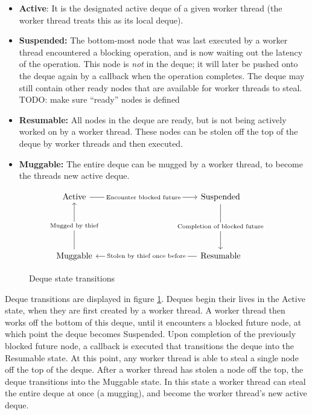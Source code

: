 \documentclass[bsc,frontabs,singlespacing,parskip,deptreport,normalheadings]{infthesis}
\begin{document}
\begin{itemize}
    \item \textbf{Active}: It is the designated active deque of a given worker
        thread (the worker thread treats this as its local deque).
    \item \textbf{Suspended:} The bottom-most node that was last executed by a
        worker thread encountered a blocking operation, and is now waiting out
        the latency of the operation. This node is \textit{not} in the deque; it
        will later be pushed onto the deque again by a callback when the
        operation completes. The deque may still contain other ready nodes that
        are available for worker threads to steal. TODO: make sure ``ready''
        nodes is defined
    \item \textbf{Resumable:} All nodes in the deque are ready, but is not being
        actively worked on by a worker thread. These nodes can be stolen off the
        top of the deque by worker threads and then executed.
    \item \textbf{Muggable:} The entire deque can be mugged by a worker thread,
        to become the threads new active deque.
\end{itemize}

\begin{figure}[ht]
\[\begin{tikzcd}
	{\text{Active}} &&&&& {\text{Suspended}} \\
	\\
	\\
	{\text{Muggable}} &&&&& {\text{Resumable}}
	\arrow["{\text{Encounter blocked future}}"{description}, from=1-1, to=1-6]
	\arrow["{\text{Completion of blocked future}}"{description}, from=1-6, to=4-6]
	\arrow["{\text{Stolen by thief once before}}"{description}, from=4-6, to=4-1]
	\arrow["{\text{Mugged by thief}}"{description}, from=4-1, to=1-1]
\end{tikzcd}\]
\caption{Deque state transitions}
\label{figure:deque_state_transitions}
\end{figure}

Deque transitions are displayed in figure \ref{figure:deque_state_transitions}.
Deques begin their lives in the Active state, when they are first created by a
worker thread. A worker thread then works off the bottom of this deque, until it
encounters a blocked future node, at which point the deque becomes Suspended.
Upon completion of the previously blocked future node, a callback is executed
that transitions the deque into the Resumable state. At this point, any worker
thread is able to steal a single node off the top of the deque. After a worker
thread has stolen a node off the top, the deque transitions into the Muggable
state. In this state a worker thread can steal the entire deque at once (a
mugging), and become the worker thread's new active deque.
\end{document}
